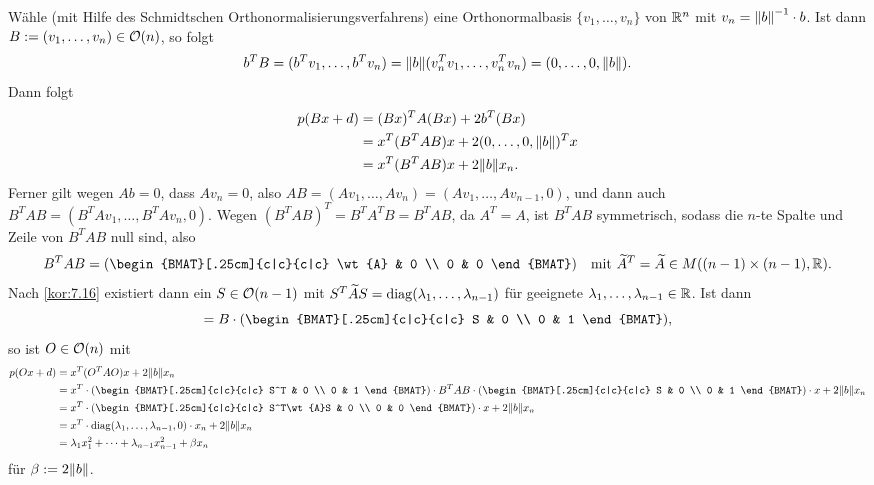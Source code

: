 \begin{beweis}
\begin{enumerate}[(i)]
		Wähle (mit Hilfe des Schmidtschen Orthonormalisierungsverfahrens) eine Orthonormalbasis $\{v_1,\dots,v_n\}$ von $\mathbb{R}^n$ mit $v_n = \left\lVert b\right\rVert^{-1} \cdot b$.
		Ist dann $B := (v_1,\dots,v_n) \in \mathcal{O}(n)$, so folgt
		\[
			b^TB = (b^Tv_1,\dots,b^Tv_n) = \no{b} (v_n^Tv_1,\dots,v_n^Tv_n) = (0,\dots,0,\no{b}).
		\]
		Dann folgt
		\begin{align*}
			p(Bx+d) &= (Bx)^T A (Bx) + 2b^T(Bx) \\
			&= x^T(B^TAB)x + 2(0,\dots,0,\no{b})^Tx \\
			&= x^T(B^TAB)x + 2 \no{b} x_n.
		\end{align*}
		Ferner gilt wegen $Ab = 0$, dass $Av_n = 0$, also $AB = (Av_1,\dots,Av_n) = (Av_1,\dots,Av_{n-1},0)$, und dann auch $B^TAB = (B^TAv_1, \dots, B^TAv_n,0)$.
		Wegen $(B^TAB)^T = B^TA^TB = B^TAB$, da $A^T = A$, ist $B^TAB$ symmetrisch, sodass die $n$-te Spalte und Zeile von $B^TAB$ null sind, also
		\[
			B^TAB = \enb{\begin{BMAT}[.25cm]{c|c}{c|c}
				\wt{A} & 0 \\
				0 & 0
				\end{BMAT}} \quad \text{mit } \wt{A}^T = \wt{A} \in M((n-1) \times (n-1),\RR).
		\]
		\newpage
		Nach \autoref{kor:7.16} existiert dann ein $S \in \mathcal{O}(n-1)$ mit $S^T\widetilde{A}S = \operatorname{diag}(\lambda_1,\dots,\lambda_{n-1})$ für geeignete $\lambda_1,\dots,\lambda_{n-1} \in \mathbb{R}$.
		Ist dann
		\[
		= B \cdot \enb{\begin{BMAT}[.25cm]{c|c}{c|c}
			S & 0 \\
			0 & 1
			\end{BMAT}},
		\]
		so ist $O \in \mathcal{O}(n)$ mit
		\begin{align*}
			p(Ox+d) &= x^T(O^TAO)x + 2 \no{b} x_n \\
			&= x^T \cdot \enb{\begin{BMAT}[.25cm]{c|c}{c|c}
				S^T & 0 \\
				0 & 1
				\end{BMAT}} \cdot B^TAB \cdot \enb{\begin{BMAT}[.25cm]{c|c}{c|c}
				S & 0 \\
				0 & 1
				\end{BMAT}} \cdot x + 2 \no{b} x_n \\
			&= x^T \cdot \enb{\begin{BMAT}[.25cm]{c|c}{c|c}
				S^T\wt{A}S & 0 \\
				0 & 0
				\end{BMAT}} \cdot x + 2 \no{b} x_n \\
			&= x^T \cdot \diag(\lambda_1,\dots,\lambda_{n-1},0) \cdot x_n + 2 \no{b} x_n \\
			&= \lambda_1 x_1^2 + \dots + \lambda_{n-1}x_{n-1}^2 + \beta x_n
		\end{align*}
		für $\beta := 2 \no{b}$. \qedhere
	\end{enumerate}
\end{beweis}

